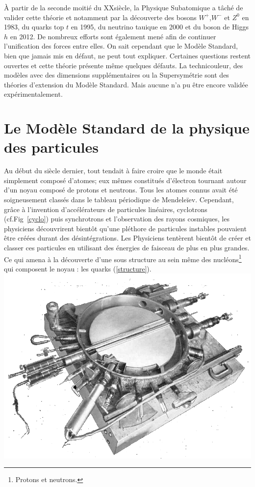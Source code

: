 À partir de la seconde moitié du XX\ieme siècle, la Physique Subatomique a tâché de valider cette théorie et notamment par la découverte des bosons  $W^{+}$,$W^{-}$ et $Z^{0}$ en \num{1983}, du quarks top $t$ en \num{1995}, du neutrino tauique en \num{2000} et du boson de Higgs $h$ en \num{2012}. De nombreux efforts sont également mené afin de continuer l'unification des forces entre elles. On sait cependant que le Modèle Standard, bien que jamais mis en défaut, ne peut tout expliquer. Certaines questions restent ouvertes et cette théorie présente même quelques défauts. La technicouleur, des modèles avec des dimensions supplémentaires ou la Supersymétrie sont des théories d'extension du Modèle Standard. Mais aucune n'a pu être encore validée expérimentalement.

\section{Le Modèle Standard de la physique des particules}
 
Au début du siècle dernier, tout tendait à faire croire que le monde était simplement composé d'atomes; eux mêmes constitués d'électron tournant autour d'un noyau composé de protons et neutrons. Tous les atomes connus avait été soigneusement classés dans le tableau périodique de Mendeleïev. Cependant, grâce à l'invention d'accélérateurs de particules linéaires, cyclotrons (cf.Fig~\ref{cyclo}) puis synchrotrons et l'observation des rayons cosmiques, les physiciens découvrirent bientôt qu'une pléthore de particules instables pouvaient être créées durant des désintégrations. Les Physiciens tentèrent bientôt de créer et classer ces particules en utilisant des énergies de faisceau de plus en plus grandes. Ce qui amena à la découverte d'une sous structure au sein même des nucléons\footnote{Protons et neutrons.} qui composent le noyau : les quarks (\ref{structure}).
\marginpar
{
	\includegraphics[width=\marginparwidth]{SM/cyclotron.png}
    \label{cyclo}
}


